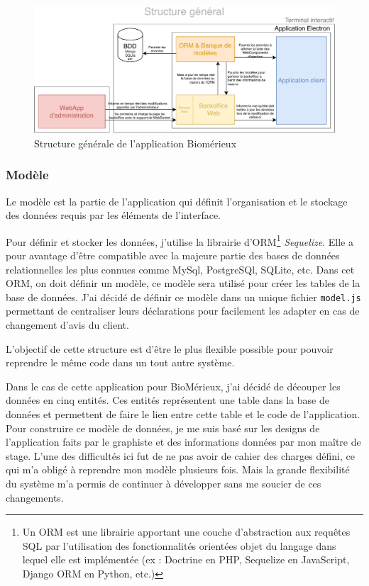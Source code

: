 \begin{figure}[h]
    \centering
    \includegraphics[scale=0.6]{img/Proposition-utopia.pdf}
    \caption{Structure générale de l'application Biomérieux}
\end{figure}

\subsubsection{Modèle}

Le modèle est la partie de l'application qui définit l'organisation et le stockage des données requis par les éléments de l'interface.

Pour définir et stocker les données, j'utilise la librairie d'ORM\footnote{Un ORM est une librairie apportant une couche d'abstraction aux requêtes SQL par l'utilisation des fonctionnalités orientées objet du langage dans lequel elle est implémentée (ex : Doctrine en PHP, Sequelize en JavaScript, Django ORM en Python, etc.)} \emph{Sequelize}.
Elle a pour avantage d'être compatible avec la majeure partie des bases de données relationnelles les plus connues comme MySql, PostgreSQl, SQLite, etc.
Dans cet ORM, on doit définir un modèle, ce modèle sera utilisé pour créer les tables de la base de données.
J'ai décidé de définir ce modèle dans un unique fichier \texttt{model.js} permettant de centraliser leurs déclarations pour facilement les adapter en cas de changement d'avis du client.

L'objectif de cette structure est d'être le plus flexible possible pour pouvoir reprendre le même code dans un tout autre système.

\bigskip

Dans le cas de cette application pour BioMérieux, j'ai décidé de découper les données en cinq entités.
Ces entités représentent une table dans la base de données et permettent de faire le lien entre cette table et le code de l'application.
Pour construire ce modèle de données, je me suis basé sur les designs de l'application faits par le graphiste et des informations données par mon maître de stage.
L'une des difficultés ici fut de ne pas avoir de cahier des charges défini, ce qui m’a obligé à reprendre mon modèle plusieurs fois.
Mais la grande flexibilité du système m'a permis de continuer à développer sans me soucier de ces changements.

